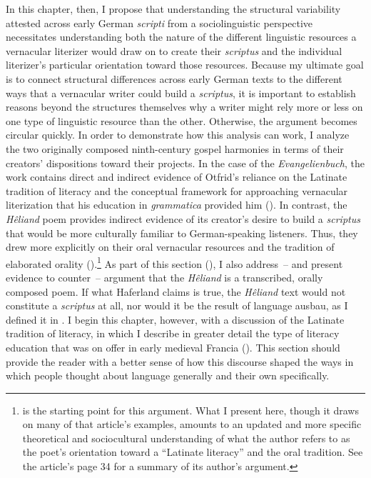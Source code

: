 In this chapter, then, I propose that understanding the structural variability attested across early German \textit{scripti} from a sociolinguistic perspective necessitates understanding both the nature of the different linguistic resources a vernacular literizer would draw on to create their \textit{scriptus} and the individual literizer’s particular orientation toward those resources. Because my ultimate goal is to connect structural differences across early German texts to the different ways that a vernacular writer could build a \textit{scriptus}, it is important to establish reasons beyond the structures themselves why a writer might rely more or less on one type of linguistic resource than the other. Otherwise, the argument becomes circular quickly. In order to demonstrate how this analysis can work, I analyze the two originally composed ninth-century gospel harmonies in terms of their creators’ dispositions toward their projects. In the case of the \textit{Evangelienbuch}, the work contains direct and indirect evidence of Otfrid’s reliance on the Latinate tradition of literacy and the conceptual framework for approaching vernacular literization that his education in \textit{grammatica} provided him (). In contrast, the \textit{Hêliand} poem provides indirect evidence of its creator’s desire to build a \textit{scriptus} that would be more culturally familiar to German-speaking listeners. Thus, they drew more explicitly on their oral vernacular resources and the tradition of elaborated orality ().\footnote{\textrm{\citet{Somers2021b} is the starting point for this argument. What I present here, though it draws on many of that article’s examples, amounts to an updated and more specific theoretical and sociocultural understanding of what the author refers to as the poet’s orientation toward a “Latinate literacy” and the oral tradition. See the article’s page 34 for a summary of its author’s argument.} } As part of this section (), I also address~-- and present evidence to counter~--  argument that the \textit{Hêliand} is a transcribed, orally composed poem. If what Haferland claims is true, the \textit{Hêliand} text would not constitute a \textit{scriptus} at all, nor would it be the result of language ausbau, as I defined it in . I begin this chapter, however, with a discussion of the Latinate tradition of literacy, in which I describe in greater detail the type of literacy education that was on offer in early medieval Francia (). This section should provide the reader with a better sense of how this discourse shaped the ways in which people thought about language generally and their own specifically.

